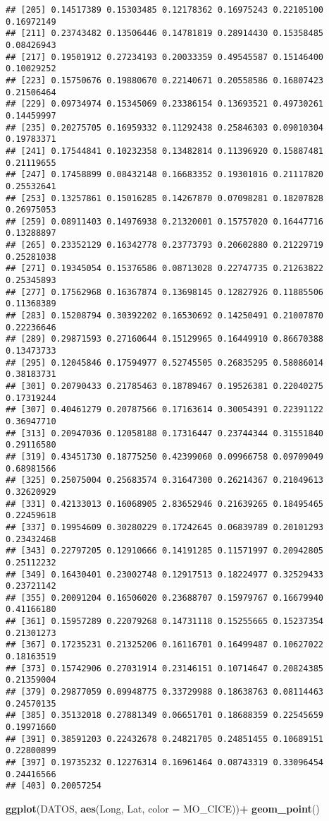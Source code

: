 \documentclass[
]{article}
\newenvironment{Shaded}{\begin{snugshade}}{\end{snugshade}}
\newcommand{\DataTypeTok}[1]{\textcolor[rgb]{0.13,0.29,0.53}{#1}}
\newcommand{\KeywordTok}[1]{\textcolor[rgb]{0.13,0.29,0.53}{\textbf{#1}}}
\newcommand{\NormalTok}[1]{#1}
\newcommand{\OperatorTok}[1]{\textcolor[rgb]{0.81,0.36,0.00}{\textbf{#1}}}
\newcommand{\StringTok}[1]{\textcolor[rgb]{0.31,0.60,0.02}{#1}}
\begin{document}
\begin{verbatim}
## [205] 0.14517389 0.15303485 0.12178362 0.16975243 0.22105100 0.16972149
## [211] 0.23743482 0.13506446 0.14781819 0.28914430 0.15358485 0.08426943
## [217] 0.19501912 0.27234193 0.20033359 0.49545587 0.15146400 0.10029252
## [223] 0.15750676 0.19880670 0.22140671 0.20558586 0.16807423 0.21506464
## [229] 0.09734974 0.15345069 0.23386154 0.13693521 0.49730261 0.14459997
## [235] 0.20275705 0.16959332 0.11292438 0.25846303 0.09010304 0.19783371
## [241] 0.17544841 0.10232358 0.13482814 0.11396920 0.15887481 0.21119655
## [247] 0.17458899 0.08432148 0.16683352 0.19301016 0.21117820 0.25532641
## [253] 0.13257861 0.15016285 0.14267870 0.07098281 0.18207828 0.26975053
## [259] 0.08911403 0.14976938 0.21320001 0.15757020 0.16447716 0.13288897
## [265] 0.23352129 0.16342778 0.23773793 0.20602880 0.21229719 0.25281038
## [271] 0.19345054 0.15376586 0.08713028 0.22747735 0.21263822 0.25345893
## [277] 0.17562968 0.16367874 0.13698145 0.12827926 0.11885506 0.11368389
## [283] 0.15208794 0.30392202 0.16530692 0.14250491 0.21007870 0.22236646
## [289] 0.29871593 0.27160644 0.15129965 0.16449910 0.86670388 0.13473733
## [295] 0.12045846 0.17594977 0.52745505 0.26835295 0.58086014 0.38183731
## [301] 0.20790433 0.21785463 0.18789467 0.19526381 0.22040275 0.17319244
## [307] 0.40461279 0.20787566 0.17163614 0.30054391 0.22391122 0.36947710
## [313] 0.20947036 0.12058188 0.17316447 0.23744344 0.31551840 0.29116580
## [319] 0.43451730 0.18775250 0.42399060 0.09966758 0.09709049 0.68981566
## [325] 0.25075004 0.25683574 0.31647300 0.26214367 0.21049613 0.32620929
## [331] 0.42133013 0.16068905 2.83652946 0.21639265 0.18495465 0.22459618
## [337] 0.19954609 0.30280229 0.17242645 0.06839789 0.20101293 0.23432468
## [343] 0.22797205 0.12910666 0.14191285 0.11571997 0.20942805 0.25112232
## [349] 0.16430401 0.23002748 0.12917513 0.18224977 0.32529433 0.23721142
## [355] 0.20091204 0.16506020 0.23688707 0.15979767 0.16679940 0.41166180
## [361] 0.15957289 0.22079268 0.14731118 0.15255665 0.15237354 0.21301273
## [367] 0.17235231 0.21325206 0.16116701 0.16499487 0.10627022 0.18163519
## [373] 0.15742906 0.27031914 0.23146151 0.10714647 0.20824385 0.21359004
## [379] 0.29877059 0.09948775 0.33729988 0.18638763 0.08114463 0.24570135
## [385] 0.35132018 0.27881349 0.06651701 0.18688359 0.22545659 0.19971660
## [391] 0.38591203 0.22432678 0.24821705 0.24851455 0.10689151 0.22800899
## [397] 0.19735232 0.12276314 0.16961464 0.08743319 0.33096454 0.24416566
## [403] 0.20057254
\end{verbatim}

\begin{Shaded}
\begin{Highlighting}[]
\KeywordTok{ggplot}\NormalTok{(DATOS, }\KeywordTok{aes}\NormalTok{(Long, Lat, }\DataTypeTok{color =}\NormalTok{ MO_CICE))}\OperatorTok{+}
\StringTok{  }\KeywordTok{geom_point}\NormalTok{()}
\end{Highlighting}
\end{Shaded}
\end{document}
